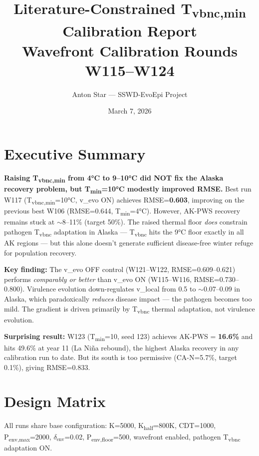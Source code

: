 \documentclass[11pt]{article}
\title{Literature-Constrained T\textsubscript{vbnc,min} Calibration Report\\[0.3em]\large Wavefront Calibration Rounds W115--W124}
\author{Anton Star --- SSWD-EvoEpi Project}
\date{March 7, 2026}
\begin{document}
\maketitle

\section{Executive Summary}

\textbf{Raising T\textsubscript{vbnc,min} from 4°C to 9--10°C did NOT fix the Alaska recovery problem, but T\textsubscript{min}=10°C modestly improved RMSE.} Best run W117 (T\textsubscript{vbnc,min}=10°C, v\_evo ON) achieves RMSE=\textbf{0.603}, improving on the previous best W106 (RMSE=0.644, T\textsubscript{min}=4°C). However, AK-PWS recovery remains stuck at $\sim$8--11\% (target 50\%). The raised thermal floor \textit{does} constrain pathogen T\textsubscript{vbnc} adaptation in Alaska --- T\textsubscript{vbnc} hits the 9°C floor exactly in all AK regions --- but this alone doesn't generate sufficient disease-free winter refuge for population recovery.

\textbf{Key finding:} The v\_evo OFF control (W121--W122, RMSE=0.609--0.621) performs \textit{comparably or better} than v\_evo ON (W115--W116, RMSE=0.730--0.800). Virulence evolution down-regulates v\_local from 0.5 to $\sim$0.07--0.09 in Alaska, which paradoxically \textit{reduces} disease impact --- the pathogen becomes too mild. The gradient is driven primarily by T\textsubscript{vbnc} thermal adaptation, not virulence evolution.

\textbf{Surprising result:} W123 (T\textsubscript{min}=10, seed 123) achieves AK-PWS = \textbf{16.6\%} and hits 49.6\% at year 11 (La Niña rebound), the highest Alaska recovery in any calibration run to date. But its south is too permissive (CA-N=5.7\%, target 0.1\%), giving RMSE=0.833.

\section{Design Matrix}

All runs share base configuration: K=5000, K\textsubscript{half}=800K, CDT=1000, P\textsubscript{env,max}=2000, $\delta_\text{env}$=0.02, P\textsubscript{env,floor}=500, wavefront enabled, pathogen T\textsubscript{vbnc} adaptation ON.
\end{document}
